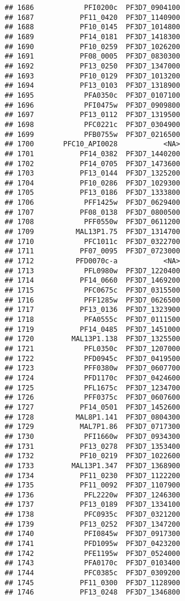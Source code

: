 \documentclass{article}\usepackage[]{graphicx}\usepackage[]{color}
\makeatletter
\newenvironment{kframe}{%
 \def\at@end@of@kframe{}%
 \ifinner\ifhmode%
  \def\at@end@of@kframe{\end{minipage}}%
  \begin{minipage}{\columnwidth}%
 \fi\fi%
 \def\FrameCommand##1{\hskip\@totalleftmargin \hskip-\fboxsep
 \colorbox{shadecolor}{##1}\hskip-\fboxsep
     \hskip-\linewidth \hskip-\@totalleftmargin \hskip\columnwidth}%
 \MakeFramed {\advance\hsize-\width
   \@totalleftmargin\z@ \linewidth\hsize
   \@setminipage}}%
 {\par\unskip\endMakeFramed%
 \at@end@of@kframe}
\newenvironment{knitrout}{}{} %
\makeatother
\begin{document}
\begin{knitrout}
\begin{kframe}
\begin{verbatim}
## 1686            PFI0200c  PF3D7_0904100
## 1687           PF11_0420  PF3D7_1140900
## 1688           PF10_0145  PF3D7_1014800
## 1689           PF14_0181  PF3D7_1418300
## 1690           PF10_0259  PF3D7_1026200
## 1691           PF08_0005  PF3D7_0830300
## 1692           PF13_0250  PF3D7_1347000
## 1693           PF10_0129  PF3D7_1013200
## 1694           PF13_0103  PF3D7_1318900
## 1695            PFA0350c  PF3D7_0107100
## 1696            PFI0475w  PF3D7_0909800
## 1697           PF13_0112  PF3D7_1319500
## 1698            PFC0221c  PF3D7_0304900
## 1699            PFB0755w  PF3D7_0216500
## 1700       PFC10_API0028           <NA>
## 1701           PF14_0382  PF3D7_1440200
## 1702           PF14_0705  PF3D7_1473600
## 1703           PF13_0144  PF3D7_1325200
## 1704           PF10_0286  PF3D7_1029300
## 1705           PF13_0186  PF3D7_1333800
## 1706            PFF1425w  PF3D7_0629400
## 1707           PF08_0138  PF3D7_0800500
## 1708            PFF0550w  PF3D7_0611200
## 1709          MAL13P1.75  PF3D7_1314700
## 1710            PFC1011c  PF3D7_0322700
## 1711           PF07_0095  PF3D7_0723000
## 1712          PFD0070c-a           <NA>
## 1713            PFL0980w  PF3D7_1220400
## 1714           PF14_0660  PF3D7_1469200
## 1715            PFC0675c  PF3D7_0315500
## 1716            PFF1285w  PF3D7_0626500
## 1717           PF13_0136  PF3D7_1323900
## 1718            PFA0555c  PF3D7_0111500
## 1719           PF14_0485  PF3D7_1451000
## 1720         MAL13P1.138  PF3D7_1325500
## 1721            PFL0350c  PF3D7_1207000
## 1722            PFD0945c  PF3D7_0419500
## 1723            PFF0380w  PF3D7_0607700
## 1724            PFD1170c  PF3D7_0424600
## 1725            PFL1675c  PF3D7_1234700
## 1726            PFF0375c  PF3D7_0607600
## 1727           PF14_0501  PF3D7_1452600
## 1728          MAL8P1.141  PF3D7_0804300
## 1729           MAL7P1.86  PF3D7_0717300
## 1730            PFI1660w  PF3D7_0934300
## 1731           PF13_0278  PF3D7_1353400
## 1732           PF10_0219  PF3D7_1022600
## 1733         MAL13P1.347  PF3D7_1368900
## 1734           PF11_0230  PF3D7_1122200
## 1735           PF11_0092  PF3D7_1107900
## 1736            PFL2220w  PF3D7_1246300
## 1737           PF13_0189  PF3D7_1334100
## 1738            PFC0935c  PF3D7_0321200
## 1739           PF13_0252  PF3D7_1347200
## 1740            PFI0845w  PF3D7_0917300
## 1741            PFD1095w  PF3D7_0423200
## 1742            PFE1195w  PF3D7_0524000
## 1743            PFA0170c  PF3D7_0103400
## 1744            PFC0385c  PF3D7_0309200
## 1745           PF11_0300  PF3D7_1128900
## 1746           PF13_0248  PF3D7_1346800

\end{verbatim}
\end{kframe}
\end{knitrout}
\end{document}
